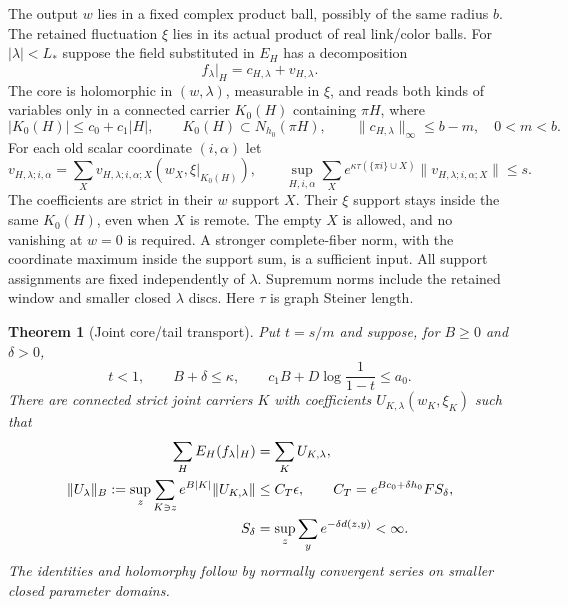 \documentclass[11pt]{article}
\newtheorem{theorem}{Theorem}[section]
\theoremstyle{remark}
\begin{document}
The output $w$ lies in a fixed complex product ball, possibly
of the same radius $b$. The retained fluctuation $\xi$ lies in
its actual product of real link/color balls. For
$|\lambda|<L_*$ suppose the field substituted in $E_H$ has
a decomposition
\begin{equation}\label{cdj-core-tail}
 f_\lambda|_H=c_{H,\lambda}+v_{H,\lambda}.
\end{equation}
The core is holomorphic in $(w,\lambda)$, measurable in $\xi$,
and reads both kinds of variables only in a connected carrier
$K_0(H)$ containing $\pi H$, where
\begin{equation}\label{cdj-core-hypotheses}
 |K_0(H)|\le c_0+c_1|H|,\qquad
 K_0(H)\subset N_{h_0}(\pi H),\qquad
 \|c_{H,\lambda}\|_\infty\le b-m,\quad 0<m<b.
\end{equation}
For each old scalar coordinate $(i,\alpha)$ let
\begin{equation}\label{cdj-tail-family}
 v_{H,\lambda;i,\alpha}
   =\sum_Xv_{H,\lambda;i,\alpha;X}
                     (w_X,\xi|_{K_0(H)}),\qquad
 \sup_{H,i,\alpha}\sum_X
 e^{\kappa\tau(\{\pi i\}\cup X)}
       \|v_{H,\lambda;i,\alpha;X}\|\le s.
\end{equation}
The coefficients are strict in their $w$ support $X$.
Their $\xi$ support stays inside the same $K_0(H)$,
even when $X$ is remote. The empty $X$ is allowed, and
no vanishing at $w=0$ is required. A stronger complete-fiber
norm, with the coordinate maximum inside the support sum,
is a sufficient input. All support assignments are fixed
independently of $\lambda$. Supremum norms include the
retained window and smaller closed $\lambda$ discs.
Here $\tau$ is graph Steiner length.

\begin{theorem}[Joint core/tail transport]\label{cdj-transport}
Put $t=s/m$ and suppose, for $B\ge0$ and $\delta>0$,
\begin{equation}\label{cdj-budget}
 t<1,\qquad B+\delta\le\kappa,\qquad
 c_1B+D\log\frac1{1-t}\le a_0.
\end{equation}
There are connected strict joint carriers $K$ with coefficients
$U_{K,\lambda}(w_K,\xi_K)$ such that
\begin{align}
 \sum_HE_H(f_\lambda|_H)&=\sum_KU_{K,\lambda},\notag\\
 \|U_\lambda\|_B
 :=\sup_z\sum_{K\ni z}e^{B|K|}\|U_{K,\lambda}\|
 &\le C_T\epsilon,\qquad
 C_T=e^{Bc_0+\delta h_0}F S_\delta,                     \label{cdj-transport-bound}\\
 S_\delta&=\sup_z\sum_y e^{-\delta d(z,y)}<\infty.\notag
\end{align}
The identities and holomorphy follow by normally convergent
series on smaller closed parameter domains.
\end{theorem}
\end{document}
